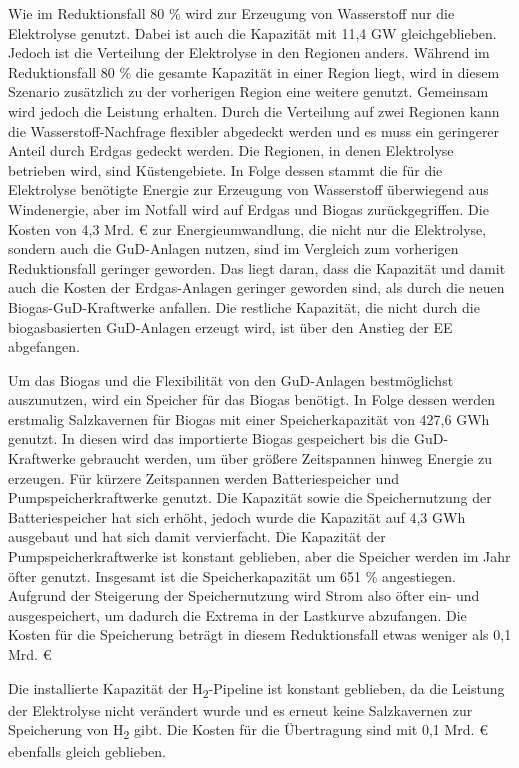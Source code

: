
Wie im Reduktionsfall 80 \% wird zur Erzeugung von Wasserstoff nur die Elektrolyse genutzt. Dabei ist auch die Kapazität mit 11,4 GW gleichgeblieben. 
Jedoch ist die Verteilung der Elektrolyse in den Regionen anders. Während im Reduktionsfall 80 \% die gesamte Kapazität in einer Region liegt, wird in diesem Szenario zusätzlich zu der vorherigen Region eine weitere genutzt. Gemeinsam wird jedoch die Leistung erhalten.
Durch die Verteilung auf zwei Regionen kann die Wasserstoff-Nachfrage flexibler abgedeckt werden und es muss ein geringerer Anteil durch Erdgas gedeckt werden.
Die Regionen, in denen Elektrolyse betrieben wird, sind Küstengebiete. In Folge dessen stammt die für die Elektrolyse benötigte Energie zur Erzeugung von Wasserstoff überwiegend aus Windenergie, aber im Notfall wird auf Erdgas und Biogas zurückgegriffen.
Die Kosten von 4,3 Mrd. € zur Energieumwandlung, die nicht nur die Elektrolyse, sondern auch die GuD-Anlagen nutzen, sind im Vergleich zum vorherigen Reduktionsfall geringer geworden. Das liegt daran, dass die Kapazität und damit auch die Kosten der Erdgas-Anlagen geringer geworden sind, als durch die neuen Biogas-GuD-Kraftwerke anfallen. Die restliche Kapazität, die nicht durch die biogasbasierten GuD-Anlagen erzeugt wird, ist über den Anstieg der EE abgefangen.

Um das Biogas und die Flexibilität von den GuD-Anlagen bestmöglichst auszunutzen, wird ein Speicher für das Biogas benötigt. In Folge dessen werden erstmalig Salzkavernen für Biogas mit einer Speicherkapazität von 427,6 GWh genutzt. In diesen wird das importierte Biogas gespeichert bis die GuD-Kraftwerke gebraucht werden, um über größere Zeitspannen hinweg Energie zu erzeugen.
Für kürzere Zeitspannen werden Batteriespeicher und Pumpspeicherkraftwerke genutzt. Die Kapazität sowie die Speichernutzung der Batteriespeicher hat sich erhöht, jedoch wurde die Kapazität auf 4,3 GWh ausgebaut und hat sich damit vervierfacht. Die Kapazität der Pumpspeicherkraftwerke ist konstant geblieben, aber die Speicher werden im Jahr öfter genutzt.
Insgesamt ist die Speicherkapazität um 651 \% angestiegen. Aufgrund der Steigerung der Speichernutzung wird Strom also öfter ein- und ausgespeichert, um dadurch die Extrema in der Lastkurve abzufangen.
Die Kosten für die Speicherung beträgt in diesem Reduktionsfall etwas weniger als 0,1 Mrd. €

Die installierte Kapazität der H\textsubscript{2}-Pipeline ist konstant geblieben, da die Leistung der Elektrolyse nicht verändert wurde und es erneut keine Salzkavernen zur Speicherung von H\textsubscript{2} gibt. Die Kosten für die Übertragung sind mit 0,1 Mrd. € ebenfalls gleich geblieben.

